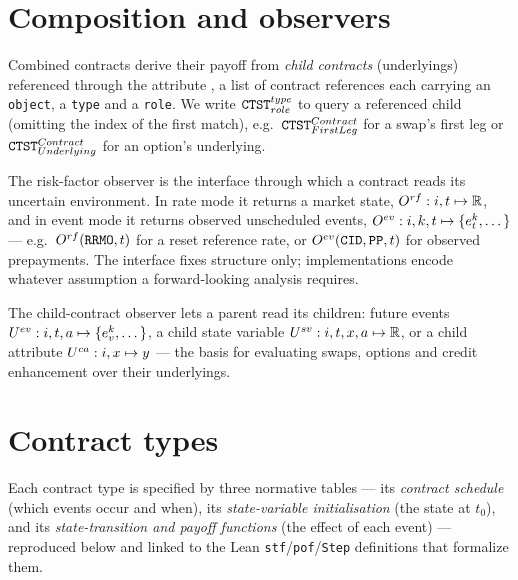 \section{Composition and observers}\label{sec:composition}

\begin{definition}\label{def:ctst}
        Combined contracts derive their payoff from \emph{child contracts}
        (underlyings) referenced through the attribute , a list of
        contract references each carrying an \texttt{object}, a \texttt{type} and
        a \texttt{role}.  We write $\texttt{CTST}_{role}^{type}$ to query a
        referenced child (omitting the index of the first match), e.g.\
        $\texttt{CTST}_{FirstLeg}^{Contract}$ for a swap's first leg or
        $\texttt{CTST}_{Underlying}^{Contract}$ for an option's underlying.
\end{definition}

\begin{definition}\label{def:rfobs}
        The risk-factor observer is the interface through which a contract reads
        its uncertain environment.  In rate mode it returns a market state,
        $O^{rf}:i,t\mapsto\mathbb{R}$, and in event mode it returns observed
        unscheduled events, $O^{ev}:i,k,t\mapsto\{e_t^k,\dots\}$ --- e.g.\
        $O^{rf}(\texttt{RRMO},t)$ for a reset reference rate, or
        $O^{ev}(\texttt{CID},\texttt{PP},t)$ for observed prepayments.  The
        interface fixes structure only; implementations encode whatever
        assumption a forward-looking analysis requires.
\end{definition}

\begin{definition}[Child-contract observer $U$]\label{def:cldobs}
        The child-contract observer lets a parent read its children: future
        events $U^{ev}:i,t,a\mapsto\{e_v^k,\dots\}$, a child state variable
        $U^{sv}:i,t,x,a\mapsto\mathbb{R}$, or a child attribute
        $U^{ca}:i,x\mapsto y$ --- the basis for evaluating swaps, options
        and credit enhancement over their underlyings.
\end{definition}

\section{Contract types}\label{sec:contracts}

Each contract type is specified by three normative tables --- its
\emph{contract schedule} (which events occur and when), its \emph{state-variable
initialisation} (the state at $t_0$), and its \emph{state-transition and payoff
functions} (the effect of each event) --- reproduced below and linked to the
Lean \texttt{stf}/\texttt{pof}/\texttt{Step} definitions that formalize them.

